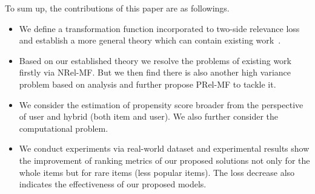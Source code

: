 \documentclass[sigconf]{acmart}
\begin{document}
To sum up, the contributions of this paper are as followings.
\begin{itemize}
	\item We define a transformation function incorporated to two-side relevance loss and establish a more general theory which can contain existing work~\cite{saito2020unbiased}.
	\item Based on our established theory we resolve the problems of existing work~\cite{saito2020unbiased} firstly via NRel-MF. But we then find there is also another high variance problem based on analysis and further propose PRel-MF to tackle it.
	\item We consider the estimation of propensity score broader from the perspective of user and hybrid (both item and user). We also further consider the computational problem. 
	
	\item We conduct experiments via real-world dataset and experimental results show the improvement of ranking metrics of our proposed solutions not only for the whole items but for rare items (less popular items). The loss decrease also indicates the effectiveness of our proposed models.
\end{itemize}
\end{document}
